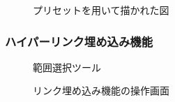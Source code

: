 \begin{figure}[htbp]
    \begin{center}
         \end{center}
    \caption{プリセットを用いて描かれた図}
    \label{fig:interactivesketch}
\end{figure}

\subsubsection{ハイパーリンク埋め込み機能}

\begin{figure}[H] \begin{minipage}{0.5\hsize}
                         \begin{center} 
                         \end{center} \caption{範囲選択ツール} \label{fig:addLink1}
\end{minipage} \begin{minipage}{0.5\hsize}
                   \begin{center} 
                   \end{center} \caption{リンク埋め込み機能の操作画面} \label{fig:addLink2}
\end{minipage}
\end{figure}

